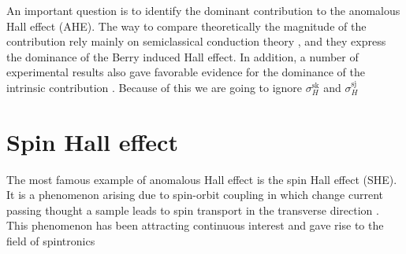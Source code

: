 An important question is to identify the dominant contribution to the anomalous Hall effect (AHE). The way to compare theoretically the magnitude of the contribution rely mainly on semiclassical conduction theory \cite{dugaev2005anomalous}, and they express the dominance of the Berry induced Hall effect. In addition, a number of experimental results also gave favorable evidence for the dominance of the intrinsic contribution \cite{tian2009proper}. Because of this we are going to ignore $\sigma_H^\textrm{sk}$ and $\sigma_H^\textrm{sj}$

\section{Spin Hall effect}
The most famous example of anomalous Hall effect is the spin Hall effect (SHE). It is a phenomenon arising due to spin-orbit coupling in which change current passing thought a sample leads to spin transport in the transverse direction \cite{d1971spin}. This phenomenon has been attracting continuous interest and gave rise to the field of spintronics \cite{wolf2001spintronics}
